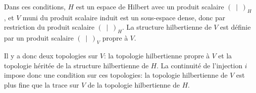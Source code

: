 \medskip
Dans ces conditions, $H$ est un espace de Hilbert avec un produit scalaire $(\ \mid\ )_H$, et $V$ muni du produit scalaire induit est un sous-espace dense, donc  par restriction du produit scalaire $(\ \mid\ )_H$.
La structure hilbertienne de $V$ est définie par un produit scalaire $(\ \mid\ )_V$ propre à $V$.

\medskip
Il y a donc deux topologies sur $V$: la topologie hilbertienne propre à $V$ et la topologie héritée de la structure hilbertienne de $H$.
La continuité de l'injection $i$ impose donc une condition sur ces topologies: la topologie hilbertienne de $V$ est plus fine que la trace sur $V$ de la topologie hilbertienne de $H$.

\medskip
{} 